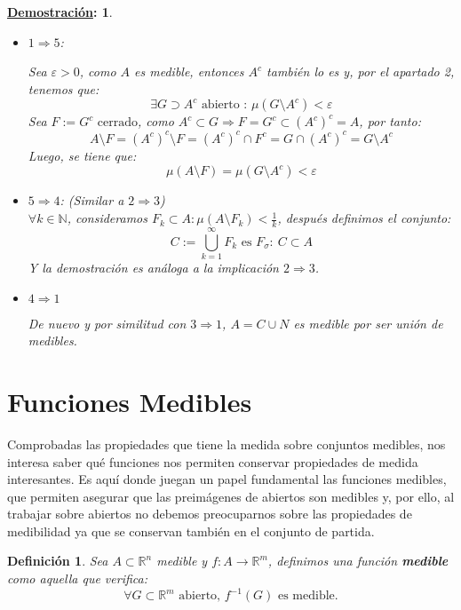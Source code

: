 \documentclass[10pt,a4paper,openright]{book}
\theoremstyle{break}
\newtheorem*{defi}{Definición}
\newtheorem*{demo}{\underline{Demostración}:}
\begin{document}
\begin{demo}
\begin{itemize}
Tenemos $A = D \setminus N$, o lo que es lo mismo, que $A = D \cap N^c$. $D$ es medible por hipótesis, y $N^c$ es el complementario de un medible, que es medible\footnote{Por el teorema de Caratheodory}. Como las intersecciones de medibles son medibles, $A$ es medible.

\item $1 \Rightarrow 5$:

Sea $\varepsilon > 0$, como $A$ es medible, entonces $A^c$ también lo es y, por el apartado 2, tenemos que:
$$\exists G \supset A^c \text{ abierto : } \mu\left( G \setminus A^c \right) < \varepsilon$$ 
Sea $F := G^c \text{ cerrado}$, como  $A^c \subset G \Rightarrow F = G^c \subset \left( A^c \right)^c = A$, por tanto:
$$A \setminus F = \left( A^c \right)^c \setminus F  =\left( A^c \right)^c \cap F^c = G \cap \left( A^c \right)^c = G \setminus A^c$$
Luego, se tiene que:
$$\mu\left( A \setminus F \right) = \mu\left( G \setminus A^c \right) < \varepsilon$$

\item $5 \Rightarrow 4$: (Similar a $2 \Rightarrow 3$)\\
$\forall k \in \mathbb{N}$, consideramos $F_k \subset A : \mu\left( A \setminus F_k \right) < \frac{1}{k}$, después definimos el conjunto:
$$C := \bigcup_{k = 1}^{\infty}F_k  \text{ es } F_{\sigma} : \ C \subset A$$ 
Y la demostración es análoga a la implicación $2 \Rightarrow 3$.

\item $4 \Rightarrow 1$

De nuevo y por similitud con $3\Rightarrow 1$, $A = C \cup N$ es medible por ser unión de medibles.
\end{itemize}
\end{demo}

\section{Funciones Medibles}
Comprobadas las propiedades que tiene la medida sobre conjuntos medibles, nos interesa saber qué funciones nos permiten conservar propiedades de medida interesantes. Es aquí donde juegan un papel fundamental las funciones medibles, que permiten asegurar que las preimágenes de abiertos son medibles y, por ello, al trabajar sobre abiertos no debemos preocuparnos sobre las propiedades de medibilidad ya que se conservan también en el conjunto de partida.
 
\begin{defi}
Sea $A \subset \mathbb{R}^n$ medible y $f: A \rightarrow \mathbb{R}^m$, definimos una función \textbf{medible} como aquella que verifica:
$$\forall G \subset \mathbb{R}^m \text{ abierto, } f^{-1}(G) \text{ es medible}.$$ 
\end{defi}
\end{document}
